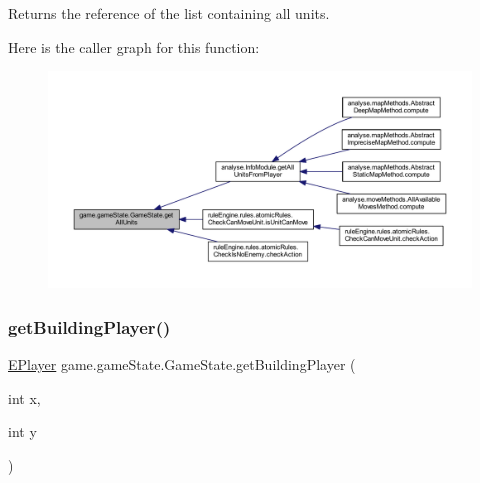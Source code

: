 \begin{DoxyReturn}{Returns}
the reference of the list containing all units. 
\end{DoxyReturn}
Here is the caller graph for this function\+:
\nopagebreak
\begin{figure}[H]
\begin{center}
\leavevmode
\includegraphics[width=350pt]{classgame_1_1game_state_1_1_game_state_a07fb5a48de7241b6cb683989bf0a3f9b_icgraph}
\end{center}
\end{figure}
\mbox{\label{classgame_1_1game_state_1_1_game_state_a25ae413bd0f2d04b162673431975ec8f}} 
\subsubsection{\texorpdfstring{get\+Building\+Player()}{getBuildingPlayer()}}
{\footnotesize\ttfamily \mbox{\hyperlink{enumgame_1_1_e_player}{E\+Player}} game.\+game\+State.\+Game\+State.\+get\+Building\+Player (\begin{DoxyParamCaption}\item[{int}]{x,  }\item[{int}]{y }\end{DoxyParamCaption})\hspace{0.3cm}{\ttfamily [inline]}}

